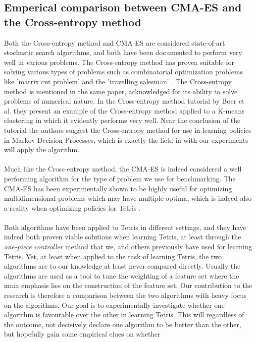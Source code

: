 \subsection{Emperical comparison between CMA-ES and the Cross-entropy method}

Both the Cross-entropy method and CMA-ES are considered state-of-art
stochastic search algorithms, and both have been documented to perform very well
in various problems. The Cross-entropy method has proven 
suitable for solving various types of problems such as 
combinatorial optimization problems like 'matrix cut problem'
and the 'travelling salesman' \citep{cetut2014}. 
The Cross-entropy method is mentioned in the same paper, acknowledged for
its ability to solve problems of numerical nature. In the 
Cross-entropy method tutorial by Boer et al. they present 
an example of the Cross-entropy method applied to 
a K-means clustering in which it evidently performs very well.
Near the conclusion of the tutorial the authors suggest the 
Cross-entropy method for use in learning policies in Markov Decision 
Processes, which is exactly the field in with our experiments will apply the
algorithm.\\
\\
Much like the Cross-entropy method, the CMA-ES is indeed considered
a well performing algorithm for the type of problem we use for benchmarking.
The CMA-ES has been experimentally shown to be highly useful for optimizing multidimensional
problems which may have multiple optima, which is indeed also a reality when 
optimizing policies for Tetris \citep{hansen2004}.\\
\\
Both algorithms have been applied to Tetris in different settings, and they have
indeed both proven viable solutions when learning Tetris, at least through the
\textit{one-piece controller} method that we, and others previously have used
for learning Tetris. Yet, at least when applied to the task of learning Tetris,
the two algorithms are to our knowledge at least never compared directly. Usually
the algorithms are used as a tool to tune the weighting of a feature set where the
main emphasis lies on the construction of the feature set. Our contribution to 
the research is therefore a comparison between the two algorithms
with heavy focus on the algorithms. Our goal is to experimentally investigate
whether one algorithm is favourable over the other in learning Tetris.
This will regardless of the outcome, not decisively declare one algorithm 
to be better than the other, but hopefully gain some empirical clues on whether 

